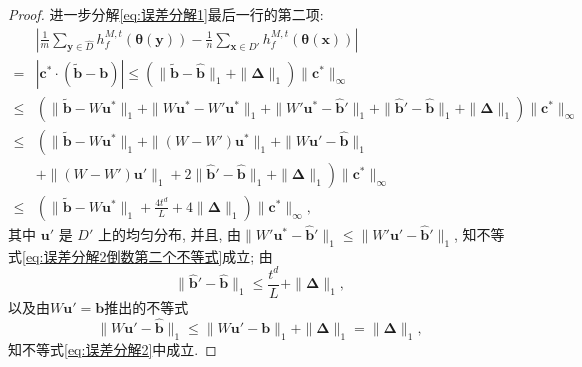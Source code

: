 \begin{proof}
进一步分解\eqref{eq:误差分解1}最后一行的第二项:
\begin{align}
  &\left|\frac{1}{m}\sum_{\mathbf{y}\in \hat{D}} h_f^{M,t}\left( \boldsymbol{\theta}(\mathbf{y}) \right) -  \frac{1}{n}\sum_{\mathbf{x}\in D'} h_f^{M,t}\left( \boldsymbol{\theta}(\mathbf{x}) \right) \right| \nonumber\\
  = & \left|\mathbf{c}^*\cdot(\tilde{\mathbf{b}} - \mathbf{b}) \right| \leq
  \left(\|\tilde{\mathbf{b}}-\hat{\mathbf{b}}\|_{1} + \|\boldsymbol{\Delta}\|_{1}\right)
  \|\mathbf{c}^*\|_{\infty} \nonumber\\
  \leq &\left(\|\tilde{\mathbf{b}}-W\mathbf{u}^*\|_{1} +
  \|W\mathbf{u}^*-W'\mathbf{u}^*\|_{1} +\|W'\mathbf{u}^*-\hat{\mathbf{b}}'\|_{1} + \|\hat{\mathbf{b}}' - \hat{\mathbf{b}}\|_{1}
  + \|\boldsymbol{\Delta}\|_{1} \right)\|\mathbf{c}^*\|_{\infty} \nonumber \\
  \leq &\left(\|\tilde{\mathbf{b}}-W\mathbf{u}^*\|_{1} +
  \|(W-W')\mathbf{u}^*\|_{1} + \|W\mathbf{u}'-\hat{\mathbf{b}}\|_{1}
  \right.\nonumber \\
  &+\left. \|(W-W')\mathbf{u}'\|_{1}+2\|\hat{\mathbf{b}}' - \hat{\mathbf{b}}\|_{1}
  + \|\boldsymbol{\Delta}\|_{1} \right)\|\mathbf{c}^*\|_{\infty} \label{eq:误差分解2倒数第二个不等式} \\
  \leq & \left(\|\tilde{\mathbf{b}}-W\mathbf{u}^*\|_{1} + \frac{4t^d}{L} +
  4\|\boldsymbol{\Delta}\|_{1} \right)\|\mathbf{c}^*\|_{\infty}, \label{eq:误差分解2}
\end{align}
其中 $\mathbf{u}'$ 是 $D'$ 上的均匀分布, 并且, 由$\|W'\mathbf{u}^*-\hat{\mathbf{b}}'\|_{1} \leq \|W'\mathbf{u}'-\hat{\mathbf{b}}'\|_{1}$,
知不等式\eqref{eq:误差分解2倒数第二个不等式}成立; 由
\begin{equation*}
  \|\hat{\mathbf{b}}'-\hat{\mathbf{b}}\|_{1} \leq \frac{t^d}{L} +\|\boldsymbol{\Delta}\|_1,
\end{equation*}
以及由$W\mathbf{u}' = \mathbf{b}$推出的不等式
\[
\|W\mathbf{u}'-\hat{\mathbf{b}}\|_{1}\leq  \|W\mathbf{u}'-\mathbf{b}\|_{1} +
\|\boldsymbol{\Delta}\|_{1}=\|\boldsymbol{\Delta}\|_{1},
\]
知不等式\eqref{eq:误差分解2}中成立.


\end{proof}
